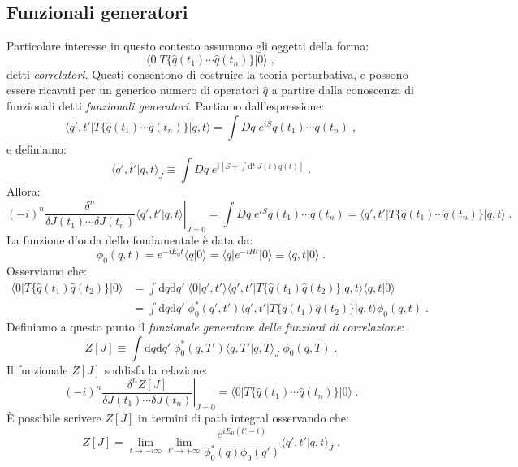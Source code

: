 \documentclass[12pt,a4paper]{article}
\theoremstyle{definition}
\numberwithin{equation}{section}
\newcommand{\diff}[1][]{\mathrm{d}#1}
\newcommand{\bra}{\langle}
\newcommand{\ket}{\rangle}
\begin{document}
\subsection{Funzionali generatori}
Particolare interesse in questo contesto assumono gli oggetti della forma:
$$
\bra 0|T\{\hat{q}(t_1)\cdots\hat{q}(t_n)\}|0\ket\;,
$$
detti \emph{correlatori}. Questi consentono di costruire la teoria perturbativa, e possono essere ricavati per un generico numero di operatori $\hat{q}$ a partire dalla conoscenza di funzionali detti \emph{funzionali generatori}. Partiamo dall'espressione:
$$
\bra q',t'|T\{\hat{q}(t_1)\cdots \hat{q}(t_n)\}|q,t\ket=\int Dq\; e^{iS}q(t_1)\cdots q(t_n)\;,
$$
e definiamo:
\begin{equation}
\bra q',t'|q,t\ket_J\equiv\int Dq\; e^{i[S+\int\diff{t}\; J(t)q(t)]}\;.
\end{equation}
Allora:
\begin{equation}
(-i)^n\left.\frac{\delta^n}{\delta J(t_1)\cdots \delta J(t_n)}\bra q',t'|q,t\ket\right|_{J=0}=\int Dq\; e^{iS}q(t_1)\cdots q(t_n)=\bra q',t'|T\{\hat{q}(t_1)\cdots \hat{q}(t_n)\}|q,t\ket\;.
\end{equation}
La funzione d'onda dello fondamentale è data da:
\begin{equation}
\phi_0(q,t)=e^{-iE_0t}\bra q|0\ket=\bra q|e^{-iHt}|0\ket\equiv \bra q,t|0\ket\;.
\end{equation}
Osserviamo che:
\begin{align*}
\bra 0|T\{\hat{q}(t_1)\hat{q}(t_2)\}|0\ket &= \int\diff{q}\diff{q'}\;\bra 0|q',t'\ket\bra q',t'|T\{\hat{q}(t_1)\hat{q}(t_2)\}|q,t\ket\bra q,t|0\ket \\
&= \int \diff{q}\diff{q'}\; \phi_0^*(q',t')\bra q',t'|T\{\hat{q}(t_1)\hat{q}(t_2)\}|q,t\ket\phi_0(q,t)\;.
\end{align*}
Definiamo a questo punto il \emph{funzionale generatore delle funzioni di correlazione}:
\begin{equation}
\boxed{
Z[J]\equiv\int\diff{q}\diff{q'}\;\phi_0^*(q,T')\bra q,T'|q,T\ket_J\;\phi_0(q,T)
}\;.
\end{equation}
Il funzionale $Z[J]$ soddisfa la relazione:
\begin{equation}
\boxed{
(-i)^n\left.\frac{\delta^nZ[J]}{\delta J(t_1)\cdots \delta J(t_n)}\right|_{J=0}=\bra 0|T\{\hat{q}(t_1)\cdots\hat{q}(t_n)\}|0\ket
}\;.
\end{equation}
È possibile scrivere $Z[J]$ in termini di path integral osservando che:
\begin{equation}
Z[J]=\lim_{t\to -i\infty}\lim_{t'\to +\infty}\frac{e^{iE_0(t'-t)}}{\phi_0^*(q)\phi_0(q')}\bra q',t'|q,t\ket_J\;.
\end{equation}
\end{document}
